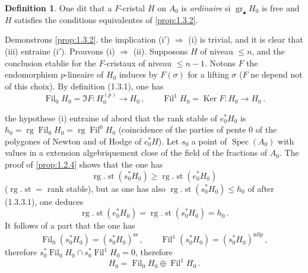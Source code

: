 \documentclass[12pt,a4paper]{article}
\theoremstyle{plain}
\theoremstyle{definition}
\newtheorem{definition}[theorem]{Definition}
\theoremstyle{remark}
\DeclareMathOperator{\Spec}{Spec}
\DeclareMathOperator{\Ker}{Ker}
\DeclareMathOperator{\gr}{gr}
\DeclareMathOperator{\Fil}{Fil}
\DeclareMathOperator{\rg}{rg}
\DeclareMathOperator{\st}{st}
\begin{document}
\begin{definition}\label{def:1.3.3}
One dit that a $F$-cristal $H$ on $A_0$ is \emph{ordinaire} si $\gr_\bullet H_0$ is free and $H$ satisfies the conditions equivalentes of \ref{prop:1.3.2}.
\end{definition}

Demonstrons \ref{prop:1.3.2}. the implication (i$'$) $\Rightarrow$ (i) is trivial, and it is clear that (iii) entraine (i$'$). Prouvons (i) $\Rightarrow$ (ii). Supposons $H$ of niveau $\leq n$, and the conclusion etablie for the $F$-cristaux of niveau $\leq n-1$. Notons $F$ the endomorphism $p$-lineaire of $H_0$ induces by $F(\sigma)$ for a lifting $\sigma$ ($F$ ne depend not of this choix). By definition (1.3.1), one has
\begin{equation}\label{eq:1.3.3.1}
\Fil_0H_0 = \Im F : H_0^{(p)} \to H_0\,, \qquad \Fil^1H_0 = \Ker F : H_0 \to H_0\,.\end{equation}

the hypothese (i) entraine of abord that the rank stable of $e_0^*H_0$ is $h_0 = \rg \Fil_0H_0 = \rg \Fil^0H_0$ (coincidence of the parties of pente 0 of the polygones of Newton and of Hodge of $e_0^*H$). Let $s_0$ a point of $\Spec(A_0)$ with values in a extension algebriquement close of the field of the fractions of $A_0$. The proof of \ref{prop:1.2.4} shows that the one has
\[
\rg\nolimits.\st(s_0^*H_0) \geq \rg\nolimits.\st(e_0^*H_0)
\]
($\rg\nolimits.\st =$ rank stable), but as one has also $\rg\nolimits.\st(s_0^*H_0) \leq h_0$ of after (1.3.3.1), one deduces
\[
\rg\nolimits.\st(e_0^*H_0) = \rg\nolimits.\st(s_0^*H_0) = h_0\,.
\]
It follows of a part that the one has
\[
\Fil_0(s_0^*H_0) = (s_0^*H_0)^{\mathrm{ss}}\,, \qquad \Fil^1(s_0^*H_0) = (s_0^*H_0)^{\mathrm{nilp}}\,,
\]
therefore $s_0^*\Fil_0H_0 \cap s_0^*\Fil^1H_0 = 0$, therefore
\begin{equation}\label{eq:1.3.3.2}
H_0 = \Fil_0H_0 \oplus \Fil^1H_0\,.\end{equation}
\end{document}
